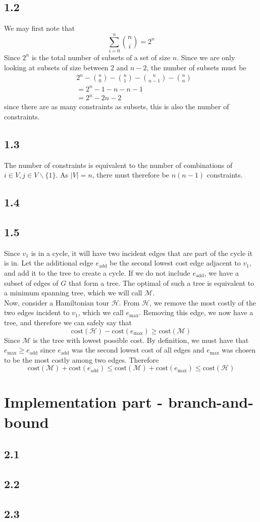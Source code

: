 \documentclass[12pt]{article}
\begin{document}
\subsection*{1.2}

We may first note that 
$$
\sum_{i=0}^n\binom{n}{i} = 2^n
$$
Since $2^n$ is the total number of subsets of a set of size $n$. Since we are only looking at subsets of size between 2 and $n-2$, the number of subsets must be 
\begin{align*}
&2^n - \binom{n}{0} - \binom{n}{1} - \binom{n}{n-1} - \binom{n}{n} \\
&=2^n - 1 - n - n - 1 \\&= 2^n - 2n - 2 
\end{align*}
since there are as many constraints as subsets, this is also the number of constraints.
\subsection*{1.3}
The number of constraints is equivalent to the number of combinations of $i \in V, j \in V \backslash\{1\}$. As $|V| = n$, there must therefore be $n(n-1)$ constraints.
\subsection*{1.4}



\subsection*{1.5}

Since $v_1$ is in a cycle, it will have two incident edges that are part of the cycle it is in. Let the additional edge $e_\text{add}$ be the second lowest cost edge adjacent to $v_1$, and add it to the tree to create a cycle. If we do not include $e_\text{add}$, we have a subset of edges of $G$ that form a tree. The optimal of such a tree is equivalent to a minimum spanning tree, which we will call $\mathcal{M}$.\\
Now, consider a Hamiltonian tour $\mathcal{H}$. From $\mathcal{H}$, we remove the most costly of the two edges incident to $v_1$, which we call $e_{\max}$. Removing this edge, we now have a tree, and therefore we can safely say that
$$
\text{cost}(\mathcal{H} ) - \text{cost}(e_{\max}) \geq \text{cost}(\mathcal{M})
$$
Since $\mathcal{M}$ is the tree with lowest possible cost. By definition, we must have that $e_{\max} \geq e_\text{add}$ since $e_\text{add}$ was the second lowest cost of all edges and $e_{\max}$ was chosen to be the most costly among two edges. Therefore
$$
\text{cost}(\mathcal{M}) + \text{cost}(e_\text{add}) \leq \text{cost}(\mathcal{M}) + \text{cost}(e_\text{max}) \leq \text{cost}(\mathcal{H})
$$


\section*{Implementation part - branch-and-bound}
\subsection*{2.1}
\subsection*{2.2}
\subsection*{2.3}
\end{document}
